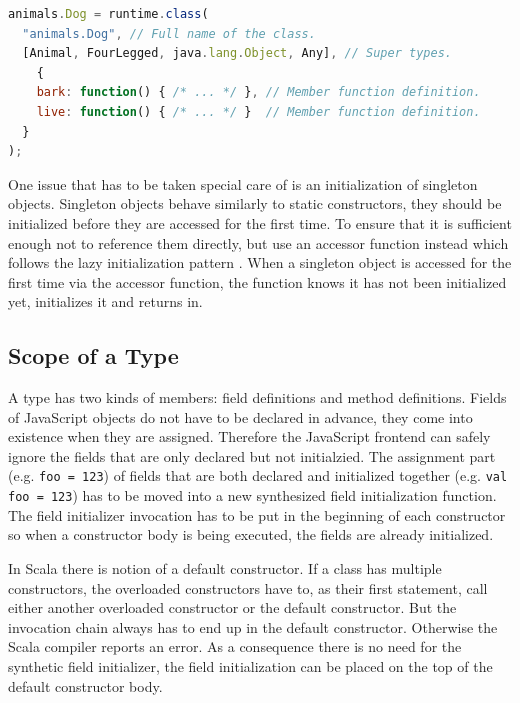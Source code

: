 \documentclass[12pt,a4paper]{report}
\begin{document}
\begin{minipage}{\linewidth}
\begin{lstlisting}[language=JavaScript,caption={The \texttt{Dog} class encoded using the \texttt{runtime.class} function},label={lst:JavaScriptClassEncoding}]
animals.Dog = runtime.class(
  "animals.Dog", // Full name of the class.                              
  [Animal, FourLegged, java.lang.Object, Any], // Super types.
	{
    bark: function() { /* ... */ }, // Member function definition.
    live: function() { /* ... */ }  // Member function definition.
  }
);
\end{lstlisting}
\end{minipage}

One issue that has to be taken special care of is an initialization of singleton objects. Singleton objects behave similarly to static constructors, they should be initialized before they are accessed for the first time. To ensure that it is sufficient enough not to reference them directly, but use an accessor function instead which follows the lazy initialization pattern \cite{Lazy}. When a singleton object is accessed for the first time via the accessor function, the function knows it has not been initialized yet, initializes it and returns in.

\subsection{Scope of a Type}

A type has two kinds of members: field definitions and method definitions. Fields of JavaScript objects do not have to be declared in advance, they come into existence when they are assigned. Therefore the JavaScript frontend can safely ignore the fields that are only declared but not initialzied. The assignment part (e.g. \texttt{foo = 123}) of fields that are both declared and initialized together (e.g. \texttt{val foo = 123}) has to be moved into a new synthesized field initialization function. The field initializer invocation has to be put in the beginning of each constructor so when a constructor body is being executed, the fields are already initialized.

In Scala there is notion of a default constructor. If a class has multiple constructors, the overloaded constructors have to, as their first statement, call either another overloaded constructor or the default constructor. But the invocation chain always has to end up in the default constructor. Otherwise the Scala compiler reports an error. As a consequence there is no need for the synthetic field initializer, the field initialization can be placed on the top of the default constructor body.
\end{document}
